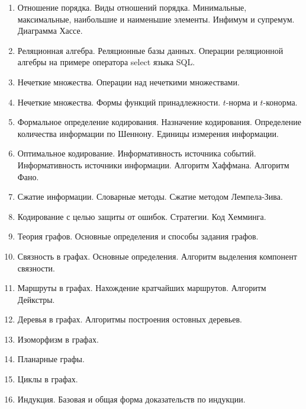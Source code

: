 \begin{enumerate}
    \item Отношение порядка. Виды отношений порядка. Минимальные, максимальные, наибольшие и наименьшие элементы. Инфимум и супремум. Диаграмма Хассе.
    
    \item Реляционная алгебра. Реляционные базы данных. Операции реляционной алгебры на примере оператора select языка SQL.
    
    \item Нечеткие множества. Операции над нечеткими множествами.
    
    \item Нечеткие множества. Формы функций принадлежности. $t$-норма и $t$-конорма.
    
    \item Формальное определение кодирования. Назначение кодирования. Определение количества информации по Шеннону. Единицы измерения информации. 
    
    \item Оптимальное кодирование. Информативность источника событий. Информативность источники информации. Алгоритм Хаффмана. Алгоритм Фано.
    
    \item Сжатие информации. Словарные методы. Сжатие методом Лемпела-Зива.
    
    \item Кодирование с целью защиты от ошибок. Стратегии. Код Хемминга.
    
    \item Теория графов. Основные определения и способы задания графов.
    
    \item Связность в графах. Основные определения. Алгоритм выделения компонент связности.
    
    \item Маршруты в графах. Нахождение кратчайших маршрутов. Алгоритм Дейкстры.
    
    \item Деревья в графах. Алгоритмы построения остовных деревьев.
    
    \item Изоморфизм в графах.
    
    \item Планарные графы.
    
    \item Циклы в графах.
    
    \item Индукция. Базовая и общая форма доказательств по индукции.
    

\end{enumerate}
